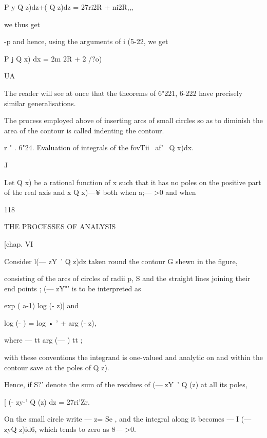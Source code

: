 {P y Q z)dz+( Q z)dz = 27ri2R + ni2R,,,



we thus get



-p and hence, using the arguments of i (5-22, we get



P j Q x) dx = 2m 2R + 2 /?o)



UA



The reader will see at once that the theorems of 6"221, 6-222 have
precisely similar generalisations.

The process employed above of inserting arcs of small circles so as to
diminish the area of the contour is called indenting the contour.

r " . 6"24. Evaluation of integrals of the fovTii \ af'~ Q x)dx.

J

Let Q x) be a rational function of x such that it has no poles on the
positive part of the real axis and x Q x)—¥ both when a;— >0 and when



118



THE PROCESSES OF ANALYSIS



[chap. VI



Consider l(— zY~' Q z)dz taken round the contour G shewn in the
figure,



consisting of the arcs of circles of radii p, S and the straight lines
joining their end points ; (— zY"' is to be interpreted as

exp ( a-1) log (- z)] and

log (- ) = log • ' + arg (- z),

where — tt arg (— ) tt ;

with these conventions the integrand is one-valued and analytic on and
within the contour save at the poles of Q z).

Hence, if S?' denote the sum of the residues of (— zY~' Q (z) at all
its poles,




[ (- zy-' Q (z) dz = 27ri'Zr.



On the small circle write — z= Se , and the integral along it becomes
— I (— zyQ z)id6, which tends to zero as 8— >0.



}
